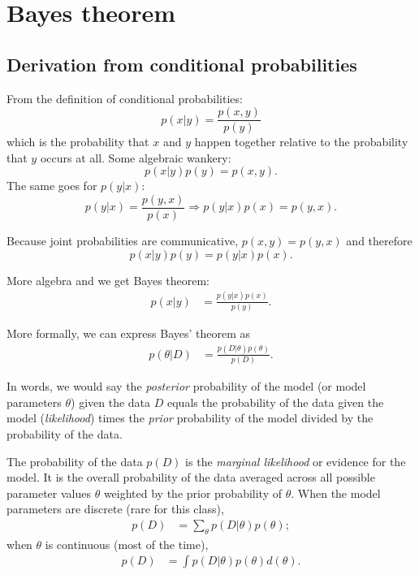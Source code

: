 \documentclass[12pt]{article}
\begin{document}
\section{Bayes theorem}

\subsection*{Derivation from conditional probabilities}

From the definition of conditional probabilities:
\begin{equation}
  p(x|y) = \frac{p(x,y)}{p(y)}
\end{equation}
which is the probability that $x$ and $y$ happen together relative to the probability that $y$ occurs at all. Some algebraic wankery: 
\begin{equation}
  p(x|y)p(y) = p(x,y). 
\end{equation}
The same goes for $p(y|x)$:
\begin{equation}
  p(y|x) = \frac{p(y,x)}{p(x)} \Rightarrow p(y|x)p(x) = p(y,x).
\end{equation}

\noindent Because joint probabilities are communicative, $p(x,y)=p(y,x)$ and therefore
\begin{equation}
  p(x|y)p(y) = p(y|x)p(x). 
\end{equation}

\noindent More algebra and we get Bayes theorem:
\begin{align}
  p(x|y) &= \frac{p(y|x)p(x)}{p(y)}. 
\end{align}

 More formally, we can express Bayes' theorem as 
\begin{align}
  p(\theta|D) &= \frac{p(D|\theta)p(\theta)}{p(D)}. 
\end{align}

\noindent In words, we would say the \emph{posterior} probability of the model (or model parameters $\theta$) given the data $D$ equals the probability of the data given the model (\emph{likelihood}) times the \emph{prior} probability of the model divided by the probability of the data. 
 
 The probability of the data $p(D)$ is the \emph{marginal likelihood} or evidence for the model. It is the overall probability of the data averaged across all possible parameter values $\theta$ weighted by the prior probability of $\theta$. When the model parameters are discrete (rare for this class), 
 \begin{align}
   p(D) &= \sum_\theta p(D|\theta)p(\theta);
 \end{align}
when $\theta$ is continuous (most of the time),
\begin{align}
   p(D) &= \int p(D|\theta)p(\theta) d(\theta).
 \end{align}
\end{document}
